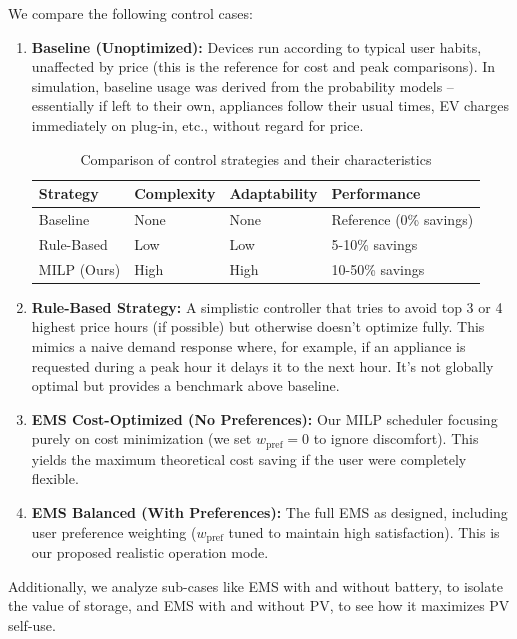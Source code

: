 \documentclass[12pt,a4paper]{article}
\begin{document}
We compare the following control cases:
\begin{enumerate}
    \item \textbf{Baseline (Unoptimized):} Devices run according to typical user habits, unaffected by price (this is the reference for cost and peak comparisons). In simulation, baseline usage was derived from the probability models – essentially if left to their own, appliances follow their usual times, EV charges immediately on plug-in, etc., without regard for price.
    
    \begin{table}[H]
    \centering
    \caption{Comparison of control strategies and their characteristics}
    \label{tab:v17-control-cases}
    \begin{tabularx}{\textwidth}{lXXX}
    \toprule
    \textbf{Strategy} & \textbf{Complexity} & \textbf{Adaptability} & \textbf{Performance} \\
    \midrule
    Baseline & None & None & Reference (0\% savings) \\
    Rule-Based & Low & Low & 5-10\% savings \\
    MILP (Ours) & High & High & 10-50\% savings \\
    \bottomrule
    \end{tabularx}
    \end{table}
    
    \item \textbf{Rule-Based Strategy:} A simplistic controller that tries to avoid top 3 or 4 highest price hours (if possible) but otherwise doesn’t optimize fully. This mimics a naive demand response where, for example, if an appliance is requested during a peak hour it delays it to the next hour. It’s not globally optimal but provides a benchmark above baseline.
    \item \textbf{EMS Cost-Optimized (No Preferences):} Our MILP scheduler focusing purely on cost minimization (we set $w_{\text{pref}}=0$ to ignore discomfort). This yields the maximum theoretical cost saving if the user were completely flexible.
    \item \textbf{EMS Balanced (With Preferences):} The full EMS as designed, including user preference weighting ($w_{\text{pref}}$ tuned to maintain high satisfaction). This is our proposed realistic operation mode.
\end{enumerate}
Additionally, we analyze sub-cases like EMS with and without battery, to isolate the value of storage, and EMS with and without PV, to see how it maximizes PV self-use.
\end{document}

